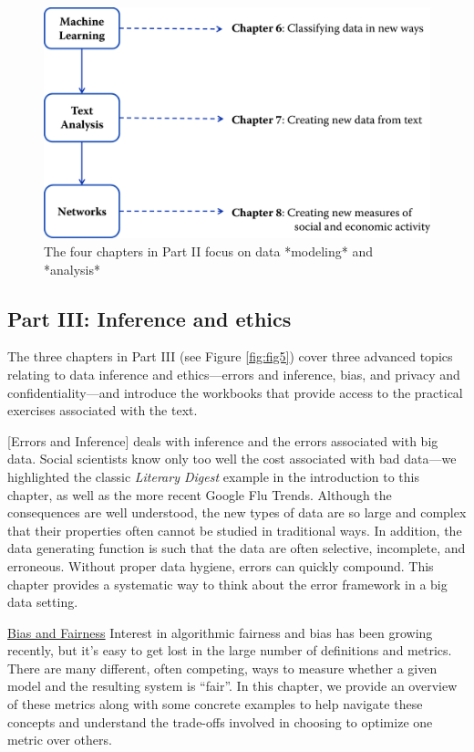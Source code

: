 \documentclass[]{krantz}
\begin{document}
\begin{figure}

{\centering \includegraphics[width=0.7\linewidth]{ChapterIntro/figures/Figure3} 

}

\caption{The four chapters in Part II focus on data *modeling* and *analysis*}\label{fig:fig4}
\end{figure}

\subsection{Part III: Inference and
ethics}\label{part-iii-inference-and-ethics}

The three chapters in Part III (see Figure \ref{fig:fig5}) cover three
advanced topics relating to data inference and ethics---errors and
inference, bias, and privacy and confidentiality---and introduce the
workbooks that provide access to the practical exercises associated with
the text.

{[}Errors and Inference{]} deals with inference and the errors
associated with big data. Social scientists know only too well the cost
associated with bad data---we highlighted the classic \emph{Literary
Digest} example in the introduction to this chapter, as well as the more
recent Google Flu Trends. Although the consequences are well understood,
the new types of data are so large and complex that their properties
often cannot be studied in traditional ways. In addition, the data
generating function is such that the data are often selective,
incomplete, and erroneous. Without proper data hygiene, errors can
quickly compound. This chapter provides a systematic way to think about
the error framework in a big data setting.

\protect\hyperlink{chap:bias}{Bias and Fairness} Interest in algorithmic
fairness and bias has been growing recently, but it's easy to get lost
in the large number of definitions and metrics. There are many
different, often competing, ways to measure whether a given model and
the resulting system is ``fair''. In this chapter, we provide an
overview of these metrics along with some concrete examples to help
navigate these concepts and understand the trade-offs involved in
choosing to optimize one metric over others.
\end{document}

